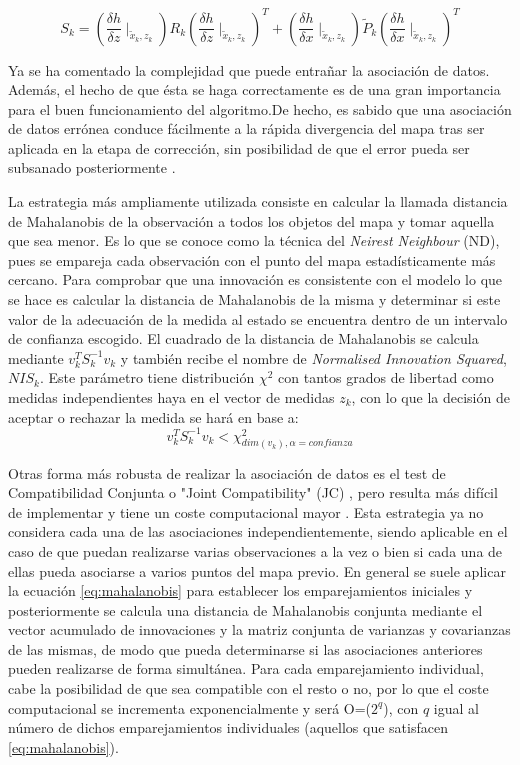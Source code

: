 \begin{equation}\label{eq:SEKF_im}
    S_{k} = (\frac{\delta h}{\delta z} \mid _{\tilde{x}_{k},z_{k}}) R_{k} (\frac{\delta h}{\delta z} \mid _{\tilde{x}_{k},z_{k}})^{T}+(\frac{\delta h}{\delta x}\mid_{\tilde{x}_{k},z_{k}})\tilde{P}_{k} (\frac{\delta h}{\delta x}\mid_{\tilde{x}_{k},z_{k}})^{T}
\end{equation}

Ya se ha comentado la complejidad que puede entrañar la asociación de datos. Además, el hecho de que ésta se haga correctamente es de una gran importancia para el buen funcionamiento del algoritmo.De hecho, es sabido que una asociación de datos errónea conduce fácilmente a la rápida divergencia del mapa tras ser aplicada en la etapa de corrección, sin posibilidad de que el error pueda ser subsanado posteriormente \cite{Neira01}.

La estrategia más ampliamente utilizada consiste en calcular la llamada distancia de Mahalanobis de la observación a todos los objetos del mapa y tomar aquella que sea menor. Es lo que se conoce como la técnica del \emph{Neirest Neighbour }(ND), pues se empareja cada observación con el punto del mapa estadísticamente más cercano. Para comprobar que una innovación es consistente con el modelo lo que se hace es calcular la distancia de Mahalanobis de la misma y determinar si este valor de la adecuación de la medida al estado se encuentra dentro de un intervalo de confianza escogido. El cuadrado de la distancia de Mahalanobis se calcula mediante $v_{k}^{T}S_{k}^{-1}v_{k}$ y también recibe el nombre de \emph{Normalised Innovation Squared}, $NIS_{k}$. Este parámetro tiene distribución $\chi^{2}$ con tantos grados de libertad como medidas independientes haya en el vector de medidas $z_{k}$, con lo que la decisión de aceptar o rechazar la medida se hará en base a:
\begin{equation}\label{eq:mahalanobis}
    v_{k}^{T}S_{k}^{-1}v_{k}<\chi^{2}_{dim(v_{k}),\alpha = confianza}
\end{equation}

Otras forma más robusta de realizar la asociación de datos es el test de Compatibilidad Conjunta o "Joint Compatibility" (JC) \cite{Neira01}, pero resulta más difícil de implementar y tiene un coste computacional mayor . Esta estrategia ya no considera cada una de las asociaciones independientemente, siendo aplicable en el caso de que puedan realizarse varias observaciones a la vez o bien si cada una de ellas pueda asociarse a varios puntos del mapa previo. En general se suele aplicar la ecuación \ref{eq:mahalanobis} para establecer los emparejamientos iniciales y posteriormente se calcula una distancia de Mahalanobis conjunta mediante el vector acumulado de innovaciones y la matriz conjunta de varianzas y covarianzas de las mismas, de modo que pueda determinarse si las asociaciones anteriores pueden realizarse de forma simultánea. Para cada emparejamiento individual, cabe la posibilidad de que sea compatible con el resto o no, por lo que el coste computacional se incrementa exponencialmente y será O=($2^{q}$), con $q$ igual al número de dichos emparejamientos individuales (aquellos que satisfacen \ref{eq:mahalanobis}).

